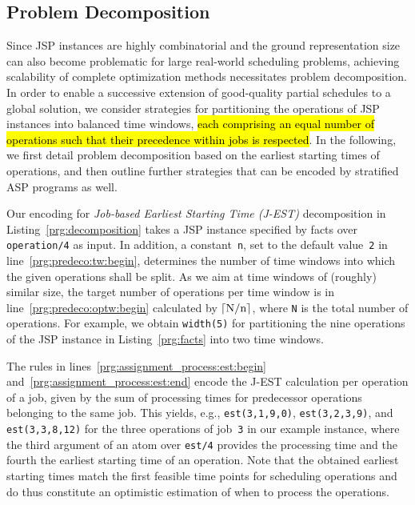 \documentclass{tlp} %
\begin{document}
\subsection{Problem Decomposition}\label{subsec:decomposition}
%
Since JSP instances are highly combinatorial and the ground representation size
can also become problematic for large real-world scheduling problems, achieving
scalability of complete optimization methods necessitates problem decomposition.
In order to enable a successive extension of good-quality partial schedules to a global solution,
we consider strategies for partitioning the operations of JSP instances
into balanced time windows, \hl{each comprising an equal number of operations such that their precedence
within jobs is respected}. %
In the following, we first detail problem decomposition based on the earliest starting times of operations, and then outline further strategies that can be encoded by stratified ASP programs as well.


Our encoding for \emph{Job-based Earliest Starting Time (J-EST)} decomposition
in Listing~\ref{prg:decomposition} takes a JSP instance specified by facts over
\lstinline{operation/4} as input.
In addition, a constant~\lstinline{n},
set to the default value~\lstinline{2} in line~\ref{prg:predeco:tw:begin},
determines the number of time windows into which the given operations
shall be split.
As we aim at time windows of (roughly) similar size,
the target number of operations per time window is in line~\ref{prg:predeco:optw:begin}
calculated by $\lceil \text{\lstinline{N}} / \text{\lstinline{n}}\rceil$,
where \lstinline{N} is the total number of operations.
For example, we obtain \lstinline{width(5)} for partitioning the nine operations
of the JSP instance in Listing~\ref{prg:facts} into two time windows.

The rules in lines~\ref{prg:assignment_process:est:begin} and~\ref{prg:assignment_process:est:end}
encode the J-EST calculation per operation of a job,
given by the sum of processing times for predecessor operations belonging to the same job.
This yields, e.g., 
\lstinline{est(3,1,9,0)},
\lstinline{est(3,2,3,9)}, and
\lstinline{est(3,3,8,12)}
for the three operations of job~\lstinline{3} in our example instance,
where the third argument of an atom over \lstinline{est/4} provides
the processing time and the fourth the earliest starting time of an operation.
Note that the obtained earliest starting times match the first feasible time
points for scheduling operations and do thus constitute an optimistic
estimation of when to process the operations.
\end{document}

